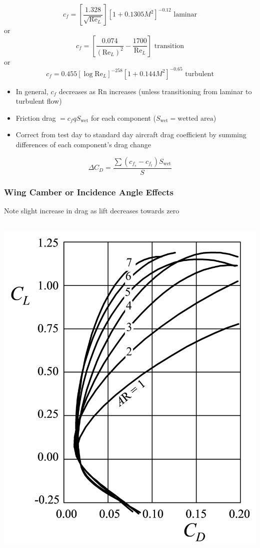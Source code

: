 \documentclass[
]{book}
\providecommand{\tightlist}{%
  \setlength{\itemsep}{0pt}\setlength{\parskip}{0pt}}
\begin{document}
\[c_f = \left[\frac{1.328}{\sqrt{\mathrm{Re}_L}}\right] \left[1 + 0.1305 M^2 \right]^{-0.12} \text{ laminar}\]
or
\[c_f = \left[\frac{0.074}{\left(\mathrm{Re}_L\right)^2} - \frac{1700}{\mathrm{Re}_L}  \right] \text{ transition}\]
or
\[c_f = 0.455\left[\log \mathrm{Re}_L\right]^{-258} \left[1 + 0.144 M^2\right]^{-0.65} \text{ turbulent}\]

\begin{itemize}
\tightlist
\item
  In general, \(c_f\) decreases as \(\mathrm{Rn}\) increases (unless transitioning from laminar to turbulent flow)
\item
  Friction drag \(= c_f q S_{\mathrm{wet}}\) for each component (\(S_{\mathrm{wet}} = \text{wetted area}\))
\item
  Correct from test day to standard day aircraft drag coefficient by summing differences of each component's drag change
\end{itemize}

\[\Delta C_D = \frac{\sum\left(c_{f_s} - c_{f_t} \right) S_{\mathrm{wet}}}{S} \]

\hypertarget{wing-camber-or-incidence-angle-effects}{%
\subsubsection*{Wing Camber or Incidence Angle Effects}\label{wing-camber-or-incidence-angle-effects}}

Note slight increase in drag as lift decreases towards zero

\includegraphics[width=5.271in,height=6.875in]{media/05/image80.svg}
\end{document}
